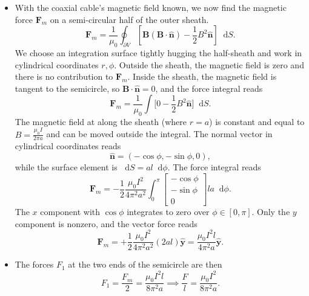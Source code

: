 \documentclass[11pt, a4paper]{article}
\newcommand{\diff}{\mathop{}\!\mathrm{d}} %
\renewcommand{\vec}[1]{\bm{#1}} %
\newcommand{\uvec}[1]{\hat{\vec{#1}}} %
\newcommand{\B}{\vec{B}}  %
\begin{document}
\begin{itemize}
	\item With the coaxial cable's magnetic field known, we now find the magnetic force $ \vec{F}_{m} $ on a semi-circular half of the outer sheath.
	\begin{equation*}
		\vec{F}_{m} = \frac{1}{\mu_{0}}\oint_{\partial V}\left [\B(\B \cdot \uvec{n}) - \frac{1}{2}B^{2}\uvec{n}\right ] \diff S.
	\end{equation*}
	We choose an integration surface tightly hugging the half-sheath and work in cylindrical coordinates $ r, \phi $. Outside the sheath, the magnetic field is zero and there is no contribution to $ \bm{F}_{m} $. Inside the sheath, the magnetic field is tangent to the semicircle, so $ \vec{B}\cdot \uvec{n} = 0 $, and the force integral reads
	\begin{equation*}
		\vec{F}_{m} = \frac{1}{\mu_{0}} \int \big[0 - \frac{1}{2}B^{2}\uvec{n}\big] \diff S .
	\end{equation*}
	The magnetic field at along the sheath (where $ r = a $) is constant and equal to $ B = \frac{\mu_{0}I}{2\pi a} $ and can be moved outside the integral. The normal vector in cylindrical coordinates reads 
	\begin{equation*}
		\uvec{n} = (- \cos \phi, -\sin \phi, 0),
	\end{equation*} 
	while the surface element is $ \diff S = a l \diff \phi $. The force integral reads
	\begin{equation*}
		\vec{F}_{m} = - \frac{1}{2}\frac{\mu_{0}I^{2}}{4\pi^{2}a^{2}} \int_{0}^{\pi}
		\begin{bmatrix}
			- \cos \phi\\
			 -\sin \phi\\
			  0
		\end{bmatrix}
		l a \diff \phi.
	\end{equation*}
	The $ x $ component with $ \cos \phi $ integrates to zero over $ \phi \in [0, \pi] $. Only the $ y $ component is nonzero, and the vector force reads
	\begin{equation*}
	 	\vec{F}_{m} = +\frac{1}{2}\frac{\mu_{0}I^{2}}{4\pi^{2}a^{2}} (2a l)\uvec{y} = \frac{\mu_{0}I^{2}l}{4\pi^{2}a} \uvec{y}.
	\end{equation*}
	
	\item The forces $ F_{1} $ at the two ends of the semicircle are then
	\begin{equation*}
		F_{1} = \frac{F_{m}}{2} =  \frac{\mu_{0}I^{2}l}{8\pi^{2}a} \implies \frac{F}{l} = \frac{\mu_{0}I^{2}}{8\pi^{2}a}.
	\end{equation*}
\end{itemize}
\end{document}
